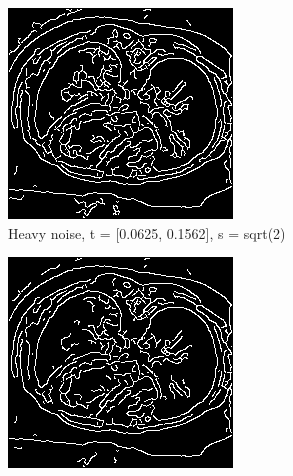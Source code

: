 \begin{figure}[H]
  \centering
  
  \begin{subfigure}{.5\textwidth}
    \centering
    \includegraphics[width=.9\textwidth]{./edgedetection/heavy_noise/h_noise_def}
    \caption{Heavy noise, t = [0.0625, 0.1562], s = sqrt(2)}
    \label{fig:h_noise_def}
  \end{subfigure}%
      \begin{subfigure}{.5\textwidth}
    \centering
    \includegraphics[width=.9\textwidth]{./edgedetection/heavy_noise/h_noise_insens_l_thres}

\end{subfigure}
\end{figure}
